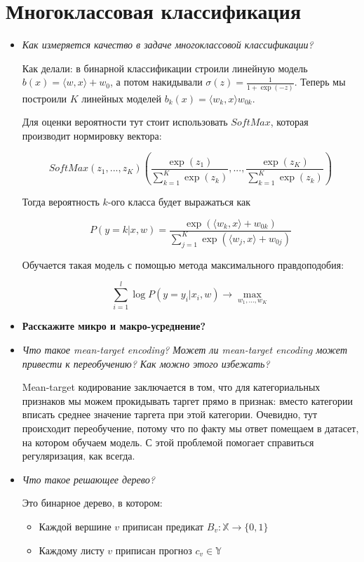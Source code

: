 \documentclass[a4paper]{article}
\begin{document}
\section*{Многоклассовая классификация}

\begin{itemize}

\item \textit{Как измеряется качество в задаче многоклассовой классификации?}

Как делали: в бинарной классификации строили линейную модель $b(x) = \langle w, x \rangle + w_0$, а потом накидывали $\sigma(z) = \frac{1}{1+\exp(-z)}$. Теперь мы построили $K$ линейных моделей $b_k(x) = \langle w_k, x \rangle w_{0k}$.

Для оценки вероятности тут стоит использовать $SoftMax$, которая производит нормировку вектора:

\[ SoftMax(z_1, ..., z_K) \left( \frac{\exp(z_1)}{\sum_{k=1}^K \exp(z_k)}, ...,  \frac{\exp(z_K)}{\sum_{k=1}^K \exp(z_k)} \right) \]

Тогда вероятность $k$-ого класса будет выражаться как 

\[ P(y=k|x, w) = \frac{\exp(\langle w_k, x \rangle + w_{0k})}{\sum_{j=1}^K \exp( \langle w_j, x \rangle + w_{0j} )} \]

Обучается такая модель с помощью метода максимального правдоподобия:

\[  \sum_{i=1}^l \log P(y=y_i | x_i, w) \rightarrow \max_{w_1, ..., w_K} \]

\item \textbf{Расскажите микро и макро-усреднение?}

\item \textit{Что такое mean-target encoding?  Может ли mean-target encoding может привести к переобучению? Как можно этого
избежать?}

Mean-target кодирование заключается в том, что для категориальных признаков мы можем прокидывать таргет прямо в признак: вместо категории вписать среднее значение таргета при этой категории. Очевидно, тут происходит переобучение, потому что по факту мы ответ помещаем в датасет, на котором обучаем модель. С этой проблемой помогает справиться регуляризация, как всегда.

\item \textit{Что такое решающее дерево?}

Это бинарное дерево, в котором:

\begin{itemize}
\item Каждой вершине $v$ приписан предикат $B_v: \mathbb{X} \rightarrow \{ 0, 1 \}$
\item Каждому листу $v$ приписан прогноз $c_v \in \mathbb{Y}$
\end{itemize}


\end{itemize}
\end{document}

